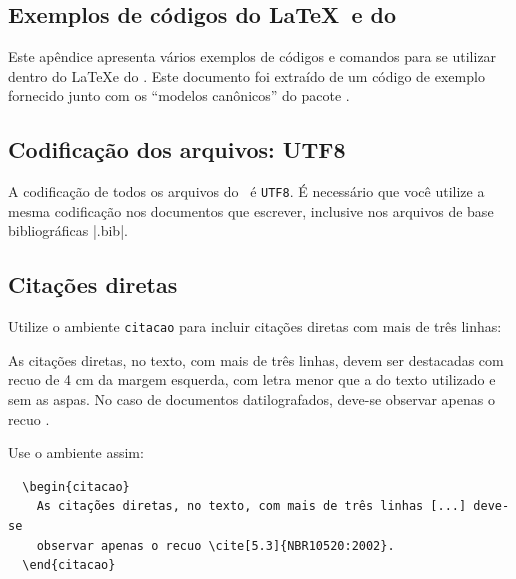\documentclass[article,12pt,oneside,a4paper,chapter=TITLE,english,brazil]{abntex2}
\begin{document}
\begin{anexosenv}


\newpage
\chapter{Exemplos de códigos do \LaTeX\ e do \abnTeX}
\label{exemplos}

Este apêndice apresenta vários exemplos de códigos e comandos para se utilizar dentro do \LaTeX e do \abnTeX. Este documento foi extraído de um código de exemplo fornecido junto com os ``modelos canônicos'' do pacote \abnTeX.

\section{Codificação dos arquivos: UTF8}

A codificação de todos os arquivos do \abnTeX\ é \texttt{UTF8}. É necessário que você utilize a mesma codificação nos documentos que escrever, inclusive nos arquivos de base bibliográficas |.bib|.

\section{Citações diretas}
\label{sec-citacao}

Utilize o ambiente \texttt{citacao} para incluir citações diretas com mais de três linhas:
\begin{citacao}
  As citações diretas, no texto, com mais de três linhas, devem ser destacadas com recuo de 4 cm da margem esquerda, com letra menor que a do texto utilizado e sem as aspas. No caso de documentos datilografados, deve-se observar apenas o recuo \cite[5.3]{NBR10520:2002}.
\end{citacao}

Use o ambiente assim:
\begin{verbatim}
  \begin{citacao}
    As citações diretas, no texto, com mais de três linhas [...] deve-se
    observar apenas o recuo \cite[5.3]{NBR10520:2002}.
  \end{citacao}
\end{verbatim}


\end{anexosenv}
\end{document}
